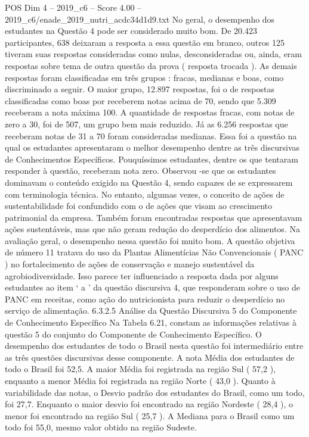 \begin{textsample}{POS Dim 4 – 2019\_c6 – Score 4.00 – 2019\_c6/enade\_2019\_nutri\_acdc34d1d9.txt}
No geral, o desempenho dos estudantes na Questão 4 pode ser considerado muito bom.
De 20.423 participantes, 638 deixaram a resposta a essa questão em branco, outros 125 tiveram suas respostas consideradas como nulas, desconsideradas ou, ainda, eram respostas sobre tema de outra questão da prova ( resposta trocada ).
As demais respostas foram classificadas em três grupos : fracas, medianas e boas, como discriminado a seguir.
O maior grupo, 12.897 respostas, foi o de respostas classificadas como boas por receberem notas acima de 70, sendo que 5.309 receberam a nota máxima 100.
A quantidade de respostas fracas, com notas de zero a 30, foi de 507, um grupo bem mais reduzido.
Já as 6.256 respostas que receberam notas de 31 a 70 foram consideradas medianas.
Essa foi a questão na qual os estudantes apresentaram o melhor desempenho dentre as três discursivas de Conhecimentos Específicos.
Pouquíssimos estudantes, dentre os que tentaram responder à questão, receberam nota zero.
Observou -se que os estudantes dominavam o conteúdo exigido na Questão 4, sendo capazes de se expressarem com terminologia técnica.
No entanto, algumas vezes, o conceito de ações de sustentabilidade foi confundido com o de ações que visam ao crescimento patrimonial da empresa.
Também foram encontradas respostas que apresentavam ações sustentáveis, mas que não geram redução do desperdício dos alimentos.
Na avaliação geral, o desempenho nessa questão foi muito bom.
A questão objetiva de número 11 tratava do uso da Plantas Alimentícias Não Convencionais ( PANC ) no fortalecimento de ações de conservação e manejo sustentável da agrobiodiversidade.
Isso parece ter influenciado a resposta dada por alguns estudantes ao item ‘ a ’ da questão discursiva 4, que responderam sobre o uso de PANC em receitas, como ação do nutricionista para reduzir o desperdício no serviço de alimentação. 6.3.2.5 Análise da Questão Discursiva 5 do Componente de Conhecimento Específico Na Tabela 6.21, constam as informações relativas à questão 5 do conjunto do Componente de Conhecimento Específico.
O desempenho dos estudantes de todo o Brasil nesta questão foi intermediário entre as três questões discursivas desse componente.
A nota Média dos estudantes de todo o Brasil foi 52,5.
A maior Média foi registrada na região Sul ( 57,2 ), enquanto a menor Média foi registrada na região Norte ( 43,0 ).
Quanto à variabilidade das notas, o Desvio padrão dos estudantes do Brasil, como um todo, foi 27,7.
Enquanto o maior desvio foi encontrado na região Nordeste ( 28,4 ), o menor foi encontrado na região Sul ( 25,7 ).
A Mediana para o Brasil como um todo foi 55,0, mesmo valor obtido na região Sudeste.

\end{textsample}
